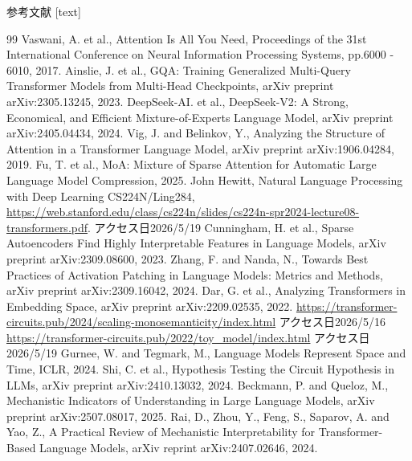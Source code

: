 \documentclass[aspectratio=43,xcolor=dvipsnames]{beamer}
\begin{document}
\begin{frame}[allowframebreaks]{参考文献}
    [text]
    \tiny
    \begin{thebibliography}{99}
        Vaswani, A. et al., Attention Is All You Need, Proceedings of the 31st International Conference on Neural Information Processing Systems, pp.6000 - 6010, 2017.
        Ainslie, J. et al., GQA: Training Generalized Multi-Query Transformer Models from Multi-Head Checkpoints, arXiv preprint arXiv:2305.13245, 2023.
        DeepSeek-AI. et al., DeepSeek-V2: A Strong, Economical, and Efficient Mixture-of-Experts Language Model, arXiv preprint arXiv:2405.04434, 2024.
        Vig, J. and Belinkov, Y., Analyzing the Structure of Attention in a Transformer Language Model, arXiv preprint arXiv:1906.04284, 2019.
        Fu, T. et al., MoA: Mixture of Sparse Attention for Automatic Large Language Model Compression, 2025.
        John Hewitt, Natural Language Processing with Deep Learning CS224N/Ling284, \url{https://web.stanford.edu/class/cs224n/slides/cs224n-spr2024-lecture08-transformers.pdf}. アクセス日2026/5/19
        Cunningham, H. et al., Sparse Autoencoders Find Highly Interpretable Features in Language Models, arXiv preprint arXiv:2309.08600, 2023.
        Zhang, F. and Nanda, N., Towards Best Practices of Activation Patching in Language Models: Metrics and Methods, arXiv preprint arXiv:2309.16042, 2024.
        Dar, G. et al., Analyzing Transformers in Embedding Space, arXiv preprint arXiv:2209.02535, 2022.
        \url{https://transformer-circuits.pub/2024/scaling-monosemanticity/index.html} アクセス日2026/5/16
        \url{https://transformer-circuits.pub/2022/toy_model/index.html} アクセス日2026/5/19
        Gurnee, W. and Tegmark, M., Language Models Represent Space and Time, ICLR, 2024.
        Shi, C. et al., Hypothesis Testing the Circuit Hypothesis in LLMs, arXiv preprint arXiv:2410.13032, 2024.
        Beckmann, P. and Queloz, M., Mechanistic Indicators of Understanding in Large Language Models, arXiv preprint arXiv:2507.08017, 2025.
        Rai, D., Zhou, Y., Feng, S., Saparov, A. and Yao, Z., A Practical Review of Mechanistic Interpretability for Transformer-Based Language Models, arXiv reprint arXiv:2407.02646, 2024.
    \end{thebibliography}
\end{frame}
\end{document}
